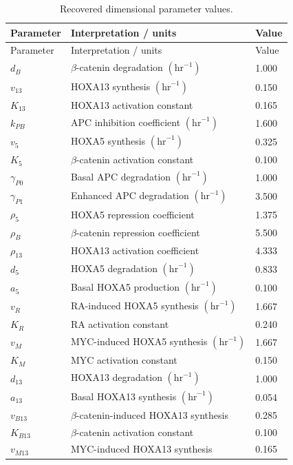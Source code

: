 \documentclass[11pt]{article}
\begin{document}
\begin{longtable}{lll}
\caption{Recovered dimensional parameter values.}\\
\toprule
Parameter & Interpretation / units & Value\\
\midrule
\endfirsthead
\toprule
Parameter & Interpretation / units & Value\\
\midrule
\endhead
\bottomrule
\endfoot
\(d_B\) & \(\beta\)-catenin degradation \((\mathrm{hr}^{-1})\) & 1.000\\
\(v_{13}\) & HOXA13 synthesis \((\mathrm{hr}^{-1})\) & 0.150\\
\(K_{13}\) & HOXA13 activation constant & 0.165\\
\(k_{PB}\) & APC inhibition coefficient \((\mathrm{hr}^{-1})\) & 1.600\\
\(v_5\) & HOXA5 synthesis \((\mathrm{hr}^{-1})\) & 0.325\\
\(K_5\) & \(\beta\)-catenin activation constant & 0.100\\
\(\gamma_{P0}\) & Basal APC degradation \((\mathrm{hr}^{-1})\) & 1.000\\
\(\gamma_{P1}\) & Enhanced APC degradation \((\mathrm{hr}^{-1})\) & 3.500\\
\(\rho_5\) & HOXA5 repression coefficient & 1.375\\
\(\rho_B\) & \(\beta\)-catenin repression coefficient & 5.500\\
\(\rho_{13}\) & HOXA13 activation coefficient & 4.333\\
\(d_5\) & HOXA5 degradation \((\mathrm{hr}^{-1})\) & 0.833\\
\(a_5\) & Basal HOXA5 production \((\mathrm{hr}^{-1})\) & 0.100\\
\(v_R\) & RA-induced HOXA5 synthesis \((\mathrm{hr}^{-1})\) & 1.667\\
\(K_R\) & RA activation constant & 0.240\\
\(v_M\) & MYC-induced HOXA5 synthesis \((\mathrm{hr}^{-1})\) & 1.667\\
\(K_M\) & MYC activation constant & 0.150\\
\(d_{13}\) & HOXA13 degradation \((\mathrm{hr}^{-1})\) & 1.000\\
\(a_{13}\) & Basal HOXA13 synthesis \((\mathrm{hr}^{-1})\) & 0.054\\
\(v_{B13}\) & \(\beta\)-catenin-induced HOXA13 synthesis & 0.285\\
\(K_{B13}\) & \(\beta\)-catenin activation constant & 0.100\\
\(v_{M13}\) & MYC-induced HOXA13 synthesis & 0.165\\

\end{longtable}
\end{document}
